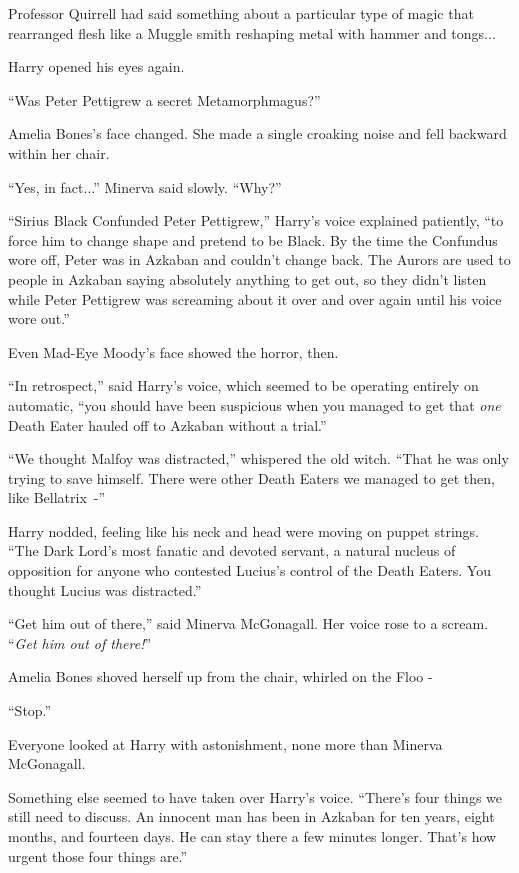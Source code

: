 Professor Quirrell had said something about a particular type of magic that rearranged flesh like a Muggle smith reshaping metal with hammer and tongs...

Harry opened his eyes again.

``Was Peter Pettigrew a secret Metamorphmagus?''

Amelia Bones's face changed. She made a single croaking noise and fell backward within her chair.

``Yes, in fact...'' Minerva said slowly. ``Why?''

``Sirius Black Confunded Peter Pettigrew,'' Harry's voice explained patiently, ``to force him to change shape and pretend to be Black. By the time the Confundus wore off, Peter was in Azkaban and couldn't change back. The Aurors are used to people in Azkaban saying absolutely anything to get out, so they didn't listen while Peter Pettigrew was screaming about it over and over again until his voice wore out.''

Even Mad-Eye Moody's face showed the horror, then.

``In retrospect,'' said Harry's voice, which seemed to be operating entirely on automatic, ``you should have been suspicious when you managed to get that \emph{one} Death Eater hauled off to Azkaban without a trial.''

``We thought Malfoy was distracted,'' whispered the old witch. ``That he was only trying to save himself. There were other Death Eaters we managed to get then, like Bellatrix~-''

Harry nodded, feeling like his neck and head were moving on puppet strings. ``The Dark Lord's most fanatic and devoted servant, a natural nucleus of opposition for anyone who contested Lucius's control of the Death Eaters. You thought Lucius was distracted.''

``Get him out of there,'' said Minerva McGonagall. Her voice rose to a scream. ``\emph{Get him out of there!}''

Amelia Bones shoved herself up from the chair, whirled on the Floo -

``Stop.''

Everyone looked at Harry with astonishment, none more than Minerva McGonagall.

Something else seemed to have taken over Harry's voice. ``There's four things we still need to discuss. An innocent man has been in Azkaban for ten years, eight months, and fourteen days. He can stay there a few minutes longer. That's how urgent those four things are.''

